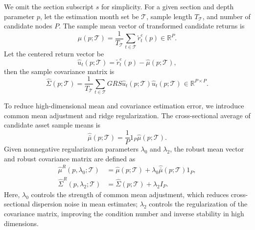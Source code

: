\documentclass[12pt]{article}
\def\bm#1{#1}%
\def\top{}%
\begin{document}
We omit the section subscript \(s\) for simplicity. For a given section and depth parameter \(p\), let the estimation month set be \(\mathcal T\), sample length \(T_{\mathcal T}\), and number of candidate nodes \(P\). The sample mean vector of transformed candidate returns is
\begin{equation}
  \widehat{\bm\mu}(p;\mathcal T)
  =
  \frac{1}{T_{\mathcal T}}
  \sum_{t\in\mathcal T}
  \widetilde{\bm r}_{t}^{e}(p)
  \in\mathbb R^P.
  \label{eq:sample_mean}
\end{equation}
Let the centered return vector be
\begin{equation}
  \widehat{\bm u}_{t}(p;\mathcal T)
  =
  \widetilde{\bm r}_{t}^{e}(p)
  -\widehat{\bm\mu}(p;\mathcal T),
  \label{eq:centered_return}
\end{equation}
then the sample covariance matrix is
\begin{equation}
  \widehat{\bm\Sigma}(p;\mathcal T)
  =
  \frac{1}{T_{\mathcal T}}
  \sum_{t\in\mathcal T}GRS
  \widehat{\bm u}_{t}(p;\mathcal T)
  \widehat{\bm u}_{t}(p;\mathcal T)^{\top}
  \in\mathbb R^{P\times P}.
  \label{eq:sample_covariance}
\end{equation}

To reduce high-dimensional mean and covariance estimation error, we introduce common mean adjustment and ridge regularization. The cross-sectional average of candidate asset sample means is
\begin{equation}
  \widehat{\bar\mu}(p;\mathcal T)
  =
  \frac{1}{P}
  \bm 1_P^{\top}\widehat{\bm\mu}(p;\mathcal T).
  \label{eq:cross_sectional_mean}
\end{equation}
Given nonnegative regularization parameters \(\lambda_0\) and \(\lambda_2\), the robust mean vector and robust covariance matrix are defined as
\begin{align}
  \widehat{\bm\mu}^{R}(p,\lambda_0;\mathcal T)
  &=
  \widehat{\bm\mu}(p;\mathcal T)
  +\lambda_0\widehat{\bar\mu}(p;\mathcal T)\bm 1_P,
  \label{eq:robust_mean}\\
  \widehat{\bm\Sigma}^{R}(p,\lambda_2;\mathcal T)
  &=
  \widehat{\bm\Sigma}(p;\mathcal T)
  +\lambda_2\bm I_P.
  \label{eq:robust_covariance}
\end{align}
Here, \(\lambda_0\) controls the strength of common mean adjustment, which reduces cross-sectional dispersion noise in mean estimates; \(\lambda_2\) controls the regularization of the covariance matrix, improving the condition number and inverse stability in high dimensions.
\end{document}
